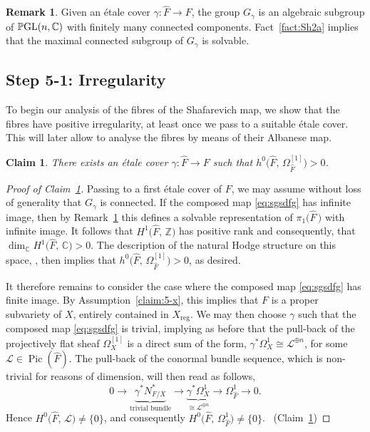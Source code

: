 \documentclass[JEP,XML,SOM,Unicode,published]{cedram}
\let\scr\mathscr
\let\vref\ref
\theoremstyle{plain}
\newtheorem{claim}[thm]{Claim}
\theoremstyle{definition}
\newtheorem{rem}[thm]{Remark}
\numberwithin{equation}{thm}
\numberwithin{enumi}{thm}
\DeclareMathOperator{\Pic}{Pic}
\newcommand{\reg}{\mathrm{reg}}
\DeclareMathOperator{\GL}{GL}
\DeclareMathOperator{\PGL}{\bP\negthinspace\GL}
\newcommand{\sL}{\scr{L}}
\newcommand{\bC}{\mathbb{C}}
\newcommand{\bP}{\mathbb{P}}
\newcommand{\bZ}{\mathbb{Z}}
\let\what\widehat
\begin{document}
\begin{rem}\label{rem:connected=solvable}
Given an étale cover $\gamma :\what{F} \to F$, the group $G_\gamma$ is an algebraic
subgroup of $\PGL(n,\bC)$ with finitely many connected components.
Fact~\vref{fact:Sh2a} implies that the maximal connected subgroup of $G_\gamma$ is
solvable.
\end{rem}

\subsection*{Step 5-1: Irregularity}

To begin our analysis of the fibres of the Shafarevich map, we show that the
fibres have positive irregularity, at least once we pass to a suitable étale
cover. This will later allow to analyse the fibres by means of their Albanese
map.

\begin{claim}\label{claim:uze}
There exists an étale cover $\gamma : \what{F} \to F$ such that
$h^0 \bigl(\what{F},\, \Omega^{[1]}_{\what{F}}\bigr) > 0$.
\end{claim}
\begin{proof}[Proof of Claim~\ref{claim:uze}]
Passing to a first étale cover of $F$, we may assume without loss of
generality that $G_\gamma$ is connected. If the composed map \eqref{eq:sgsdfg} has
infinite image, then by Remark~\ref{rem:connected=solvable} this defines a
solvable representation of $\pi_1\bigl(\what{F}\,\bigr)$ with infinite image.
It follows that $H^1 \bigl(\what{F},\, \bZ \bigr)$ has positive rank and
consequently, that $\dim_\bC H^1\bigl(\what{F},\, \bC \bigr)>0$. The description
of the natural Hodge structure on this space, \cite[Th.\,1]{Schwald16}, then
implies that $h^0 \bigl(\what{F},\, \Omega^{[1]}_{\what{F}}\bigr) > 0$, as desired.

It therefore remains to consider the case where the composed map
\eqref{eq:sgsdfg} has finite image. By Assumption~\ref{claim:5-x}, this
implies that $F$ is a proper subvariety of $X$, entirely contained in
$X_{\reg}$. We may then choose $\gamma$ such that the composed map
\eqref{eq:sgsdfg} is trivial, implying as before that the pull-back of the
projectively flat sheaf $\Omega^{[1]}_X$ is a direct sum of the form,
$\gamma^* \Omega^1_X \cong \sL^{\oplus n}$, for some $\sL \in \Pic(\what{F})$. The pull-back of the
conormal bundle sequence, which is non-trivial for reasons of dimension, will
then read as follows,
\[
0 \to \underbrace{\gamma^* N^*_{F/X}}_{\text{trivial bundle}} \to
\underbrace{\gamma^* \Omega^1_X}_{\cong \sL^{\oplus n}} \to \Omega^1_{\what{F}} \to 0.
\]
Hence $H^0\bigl(\what{F},\, \sL\bigr) \ne \{0\}$, and consequently
$H^0\bigl(\what{F},\, \Omega^1_{\what{F}}\big) \ne \{0\}$.
\qedhere~\mbox{(Claim~\ref{claim:uze})}
\end{proof}
\end{document}

